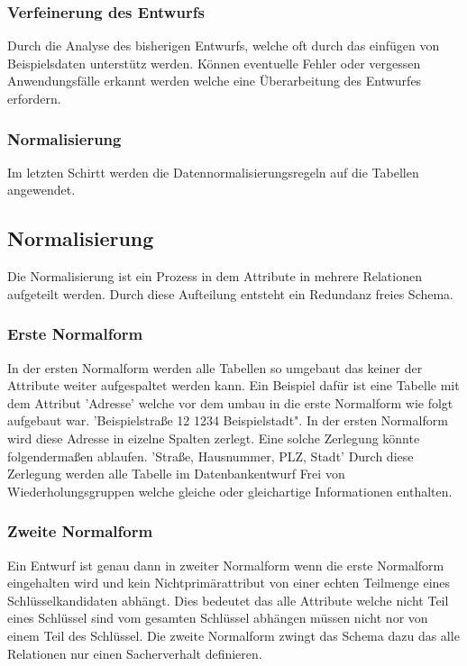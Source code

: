 			\subsubsection*{Verfeinerung des Entwurfs}
				Durch die Analyse des bisherigen Entwurfs, welche oft durch das einfügen von Beispielsdaten unterstütz werden. Können eventuelle Fehler oder vergessen Anwendungsfälle erkannt werden welche eine Überarbeitung des Entwurfes erfordern. 
			\subsubsection*{Normalisierung}
				Im letzten Schirtt werden die Datennormalisierungsregeln auf die Tabellen angewendet. 
		
		\subsection*{Normalisierung}
			Die Normalisierung ist ein Prozess in dem Attribute in mehrere Relationen aufgeteilt werden. Durch diese Aufteilung entsteht ein Redundanz freies Schema.

			\subsubsection*{Erste Normalform}
				In der ersten Normalform werden alle Tabellen so umgebaut das keiner der Attribute weiter aufgespaltet werden kann. 
					Ein Beispiel dafür ist eine Tabelle mit dem Attribut 'Adresse' welche vor dem umbau in die erste Normalform wie folgt aufgebaut war.
					'Beispielstraße 12 1234 Beispielstadt". In der ersten Normalform wird diese Adresse in eizelne Spalten zerlegt. Eine solche Zerlegung könnte folgendermaßen ablaufen.
					'Straße, Hausnummer, PLZ, Stadt'
				Durch diese Zerlegung werden alle Tabelle im Datenbankentwurf Frei von Wiederholungsgruppen welche gleiche oder gleichartige Informationen enthalten.
			
			\subsubsection*{Zweite Normalform}
				Ein Entwurf ist genau dann in zweiter Normalform wenn die erste Normalform eingehalten wird und kein Nichtprimärattribut von einer echten Teilmenge eines Schlüsselkandidaten abhängt.
				Dies bedeutet das alle Attribute welche nicht Teil eines Schlüssel sind vom gesamten Schlüssel abhängen müssen nicht nor von einem Teil des Schlüssel. 
				Die zweite Normalform zwingt das Schema dazu das alle Relationen nur einen Sacherverhalt definieren.
			
